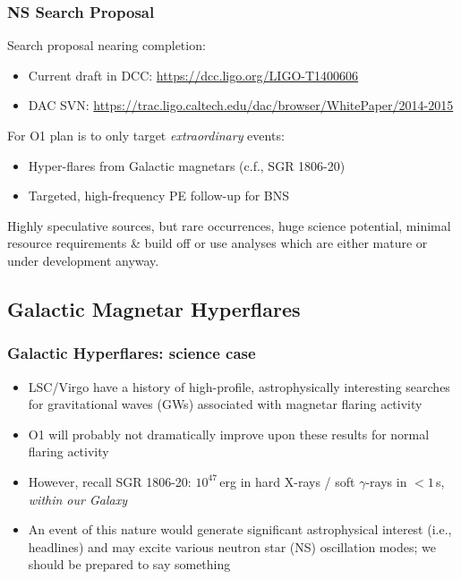 \documentclass{beamer}
\def\gw#1{gravitational wave#1 (GW#1)\gdef\gw{GW}}
\def\ns#1{neutron star#1 (NS#1)\gdef\ns{NS}}
\begin{document}
\begin{frame}
    \frametitle{NS Search Proposal}
    Search proposal nearing completion:
    \begin{itemize}
        \item Current draft in DCC: {\small \href{https://dcc.ligo.org/LIGO-T1400606}{https://dcc.ligo.org/LIGO-T1400606}}
        \item DAC SVN:
            {\small \href{https://trac.ligo.caltech.edu/dac/browser/WhitePaper/2014-2015}
            {https://trac.ligo.caltech.edu/dac/browser/WhitePaper/2014-2015}}
    \end{itemize}
    For O1 plan is to only target \emph{extraordinary} events:
    \begin{itemize}
        \item Hyper-flares from Galactic magnetars (c.f., SGR 1806-20)
        \item Targeted, high-frequency PE follow-up for BNS
    \end{itemize}
    Highly speculative sources, but rare occurrences, huge
    science potential, minimal resource requirements \& build off or use
    analyses which are either mature or under development anyway.
\end{frame}

\subsection{Galactic Magnetar Hyperflares}
\begin{frame}
    \frametitle{Galactic Hyperflares: science case}
    \begin{itemize}
        \item LSC/Virgo have a history of high-profile, astrophysically interesting
            searches for \gw{s} associated with magnetar flaring activity

        \item O1 will probably not dramatically improve upon these results for
            normal flaring activity

        \item However, recall SGR 1806-20: $10^{47}$\,erg in hard X-rays / soft $\gamma$-rays in
            $<1$\,s, \emph{within our Galaxy}

        \item An event of this nature would generate significant astrophysical
            interest (i.e., headlines) and may excite various \ns{} oscillation
            modes; we should be prepared to say something
    \end{itemize}
\end{frame}
\end{document}
